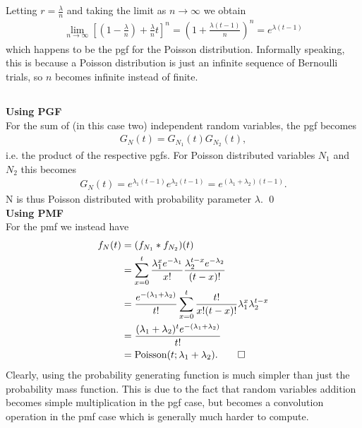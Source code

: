 \documentclass[]{article}
\begin{document}
\subsection{}
Letting $r = \frac{\lambda}{n}$ and taking the limit as $n\rightarrow\infty$ we obtain
\begin{align*}
\lim_{n\rightarrow \infty}[(1-\frac{\lambda}{n}) + \frac{\lambda}{n}t]^n = (1 + \frac{\lambda(t-1)}{n})^n = e^{\lambda(t-1)}
\end{align*}
which happens to be the pgf for the Poisson distribution. Informally speaking, this is because a Poisson distribution is just an infinite sequence of Bernoulli trials, so $n$ becomes infinite instead of finite.

\subsection{}
\textbf{Using PGF}\\
For the sum of (in this case two) independent random variables, the pgf becomes
\begin{align}
G_N(t) = G_{N_1}(t)G_{N_2}(t),
\end{align}
i.e. the product of the respective pgfs. For Poisson distributed variables $N_1$ and $N_2$ this becomes
\begin{align}
G_N(t)=e^{\lambda_1(t-1)}e^{\lambda_2(t-1)} =e^{(\lambda_1 + \lambda_2)(t-1)}.
\end{align}
N is thus Poisson distributed with probability parameter $\lambda$. \qed\\
\textbf{Using PMF}\\
For the pmf we instead have
\begin{align*}
f_N(t) &= (f_{N_1} * f_{N_2})(t) \\
&= \sum_{x=0}^{t}\frac{\lambda_1^xe^{-\lambda_1}}{x!}\frac{\lambda_2^{t-x}e^{-\lambda_2}}{(t-x)!} \\
&= \frac{e^{-(\lambda_1 + \lambda_2)}}{t!} \sum_{x=0}^{t}\frac{t!}{x!(t-x)!}\lambda_1^x\lambda_2^{t-x} \\
&= \frac{(\lambda_1 + \lambda_2)^t e^{-(\lambda_1+\lambda_2)}}{t!} \\
&= \text{Poisson}(t; \lambda_1 + \lambda_2). \qed
\end{align*}
Clearly, using the probability generating function is much simpler than just the probability mass function. This is due to the fact that random variables addition becomes simple multiplication in the pgf case, but becomes a convolution operation in the pmf case which is generally much harder to compute.
\end{document}
